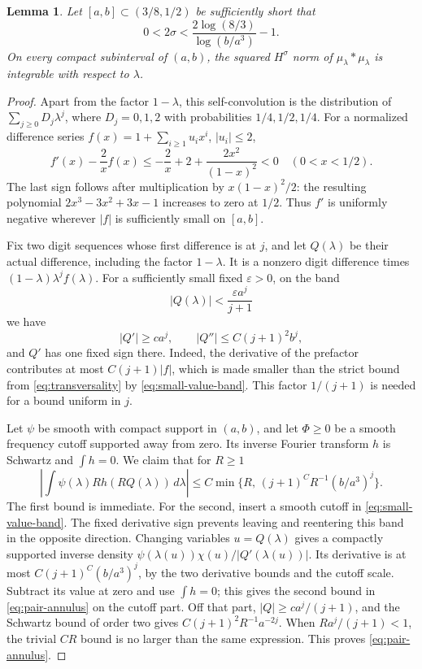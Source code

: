 \documentclass[11pt,a4paper]{amsart}
\numberwithin{equation}{section}
\newtheorem{lemma}[theorem]{Lemma}
\theoremstyle{definition}
\begin{document}
\begin{lemma}\label{lem:average-sobolev}
Let \([a,b]\subset(3/8,1/2)\) be sufficiently short that
\[
0<2\sigma<\frac{2\log(8/3)}{\log(b/a^3)}-1.
\]
On every compact subinterval of \((a,b)\), the squared
\(H^\sigma\) norm of \(\mu_\lambda*\mu_\lambda\) is integrable
with respect to \(\lambda\).
\end{lemma}
\begin{proof}
Apart from the factor \(1-\lambda\), this self-convolution is
the distribution of \(\sum_{j\geq0}D_j\lambda^j\), where
\(D_j=0,1,2\) with probabilities \(1/4,1/2,1/4\).
For a normalized difference series
\(f(x)=1+\sum_{i\geq1}u_i x^i\), \(|u_i|\leq2\),
\begin{equation}
f'(x)-\frac2x f(x)
\leq-\frac2x+2+\frac{2x^2}{(1-x)^2}<0
\quad(0<x<1/2).
\label{eq:transversality}
\end{equation}
The last sign follows after multiplication by \(x(1-x)^2/2\):
the resulting polynomial \(2x^3-3x^2+3x-1\) increases to zero
at \(1/2\). Thus \(f'\) is uniformly negative wherever \(|f|\)
is sufficiently small on \([a,b]\).

Fix two digit sequences whose first difference is at \(j\), and
let \(Q(\lambda)\) be their actual difference, including the
factor \(1-\lambda\). It is a nonzero digit difference times
\((1-\lambda)\lambda^j f(\lambda)\).
For a sufficiently small fixed \(\varepsilon>0\), on the band
\begin{equation}
|Q(\lambda)|<\frac{\varepsilon a^j}{j+1}
\label{eq:small-value-band}
\end{equation}
we have
\[
|Q'|\geq c a^j,\qquad |Q''|\leq C(j+1)^2b^j,
\]
and \(Q'\) has one fixed sign there. Indeed, the derivative of
the prefactor contributes at most \(C(j+1)|f|\), which is made
smaller than the strict bound from \eqref{eq:transversality}
by \eqref{eq:small-value-band}. This factor \(1/(j+1)\) is needed
for a bound uniform in \(j\).

Let \(\psi\) be smooth with compact support in \((a,b)\), and
let \(\Phi\geq0\) be a smooth frequency cutoff supported away
from zero. Its inverse Fourier transform \(h\) is Schwartz and
\(\int h=0\). We claim that for \(R\geq1\)
\begin{equation}
\left|\int\psi(\lambda)R h(RQ(\lambda))\,d\lambda\right|
\leq C\min\{R,\,(j+1)^C R^{-1}(b/a^3)^j\}.
\label{eq:pair-annulus}
\end{equation}
The first bound is immediate. For the second, insert a smooth
cutoff in \eqref{eq:small-value-band}. The fixed derivative sign
prevents leaving and reentering this band in the opposite
direction. Changing variables \(u=Q(\lambda)\) gives a compactly
supported inverse density
\(\psi(\lambda(u))\chi(u)/|Q'(\lambda(u))|\).
Its derivative is at most \(C(j+1)^C(b/a^3)^j\), by the two
derivative bounds and the cutoff scale.
Subtract its value at zero and use \(\int h=0\); this gives the
second bound in \eqref{eq:pair-annulus} on the cutoff part.
Off that part, \(|Q|\geq c a^j/(j+1)\), and the Schwartz bound
of order two gives \(C(j+1)^2R^{-1}a^{-2j}\).
When \(Ra^j/(j+1)<1\), the trivial \(CR\) bound is no larger
than the same expression. This proves \eqref{eq:pair-annulus}.


\end{proof}
\end{document}
